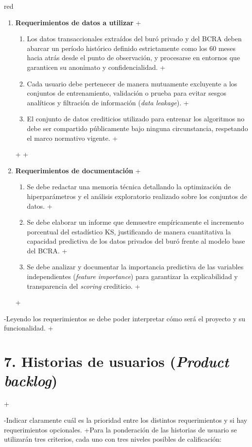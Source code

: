 \documentclass[
 11pt, %
-%
+codirector, %
 ]{charter}
\begin{document}
\begin{table}[ht]
\begin{table}[ht]
\begin{consigna}{red}
\begin{enumerate}
\begin{enumerate}
+    \end{enumerate}
+
+    \item \textbf{Requerimientos de datos a utilizar}
+    \begin{enumerate}
+        \item Los datos transaccionales extraídos del buró privado y del BCRA deben abarcar un período histórico definido estrictamente como los 60 meses hacia atrás desde el punto de observación, y procesarse en entornos que garanticen su anonimato y confidencialidad.
+        \item Cada usuario debe pertenecer de manera mutuamente excluyente a los conjuntos de entrenamiento, validación o prueba para evitar sesgos analíticos y filtración de información (\textit{data leakage}).
+        \item El conjunto de datos crediticios utilizado para entrenar los algoritmos no debe ser compartido públicamente bajo ninguna circunstancia, respetando el marco normativo vigente.
+    \end{enumerate}
+
+    \item \textbf{Requerimientos de documentación}
+    \begin{enumerate}
+        \item Se debe redactar una memoria técnica detallando la optimización de hiperparámetros y el análisis exploratorio realizado sobre los conjuntos de datos.
+        \item Se debe elaborar un informe que demuestre empíricamente el incremento porcentual del estadístico KS, justificando de manera cuantitativa la capacidad predictiva de los datos privados del buró frente al modelo base del BCRA.
+        \item Se debe analizar y documentar la importancia predictiva de las variables independientes (\textit{feature importance}) para garantizar la explicabilidad y transparencia del \textit{scoring} crediticio.
+    \end{enumerate}
+
 \end{enumerate}
 
-Leyendo los requerimientos se debe poder interpretar cómo será el proyecto y su funcionalidad.
+\section{7. Historias de usuarios (\textit{Product backlog})}
+\label{sec:backlog}
 
-Indicar claramente cuál es la prioridad entre los distintos requerimientos y si hay requerimientos opcionales. 
+Para la ponderación de las historias de usuario se utilizarán tres criterios, cada uno con tres niveles posibles de calificación:
 

\end{consigna}
\end{table}
\end{table}
\end{document}
